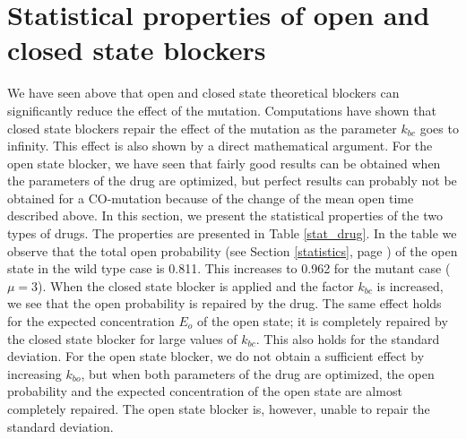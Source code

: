 \bigskip


\section{Statistical properties of open and closed state blockers \label{stat1Ddrg}}

We have seen above that open and closed state theoretical blockers can significantly reduce the effect of the mutation. Computations have shown that closed state blockers repair the effect of the mutation as the parameter $k_{bc}$ goes to infinity. This effect is also shown by a direct mathematical argument. For the open state blocker, we have seen that fairly good results can be obtained when the parameters of the drug are optimized, but perfect results can probably not be obtained for a CO-mutation because of the change of the mean open time described above.
In this section, we present the statistical properties of the two types of drugs. The properties are presented in Table \ref{stat_drug}. In the table we observe that the total open probability (see Section \ref{statistics}, page  \pageref{statistics}) of the open state in the wild type case is 0.811. This increases to 0.962 for the mutant case ($\mu=3$). When the closed state blocker is applied and the factor $k_{bc}$ is increased, we see that the open probability is repaired by the drug. The same effect holds for the expected concentration $E_o$ of the open state; it is completely repaired by the closed state blocker for large values of $k_{bc}$. This also holds for the standard deviation. For the open state blocker, we do not obtain a sufficient effect by increasing $k_{bo}$, but when both parameters of the drug are optimized, the open probability and the expected concentration of the open state are almost completely repaired. The open state blocker is, however, unable to repair the standard deviation. 


